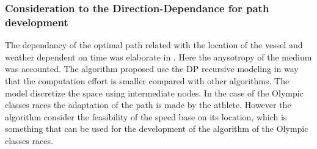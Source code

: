 \subsubsection{Consideration to the Direction-Dependance for path development}
The dependancy of the optimal path related with the location of the vessel and weather dependent on time was elaborate in \cite{dolinskaya2012optimal}.  Here the anysotropy of the medium was accounted. The algorithm proposed use the DP recursive modeling in way that the computation effort is smaller compared with other algorithms. The model discretize the space using intermediate nodes. %
In the case of the Olympic classes races the adaptation of the path is made by the athlete. However the algorithm consider the feasibility of the speed base on its location, which is something that can be used for the development of the algorithm of the Olympic classes races. \par 
